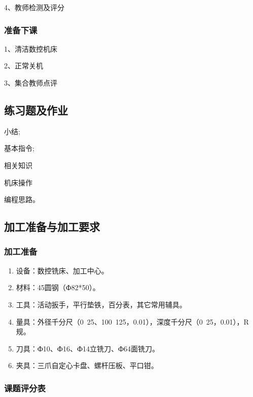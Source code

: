 4、教师检测及评分
\subsubsection{准备下课}
1、清洁数控机床

2、正常关机

3、集合教师点评

\subsection{练习题及作业}
\begin{compactenum}[1、]
	\item 小结;
	\item 基本指令;
	\item 相关知识
	\item 机床操作
	\item 编程思路。
\end{compactenum}

\vfill
\subsection{加工准备与加工要求}
\subsubsection{加工准备}
\begin{enumerate}[1、]
	\item 设备：数控铣床、加工中心。
	\item 材料：45圆钢（Ф82*50）。
	\item 工具：活动扳手，平行垫铁，百分表，其它常用辅具。
	\item 
	量具：外径千分尺（0~25、100~125，0.01），深度千分尺（0~25，0.01），R规。
	\item 刀具：Ф10、Ф16、Ф14立铣刀、Ф64面铣刀。
	\item 夹具：三爪自定心卡盘、螺杆压板、平口钳。
\end{enumerate}
\subsubsection{课题评分表}

